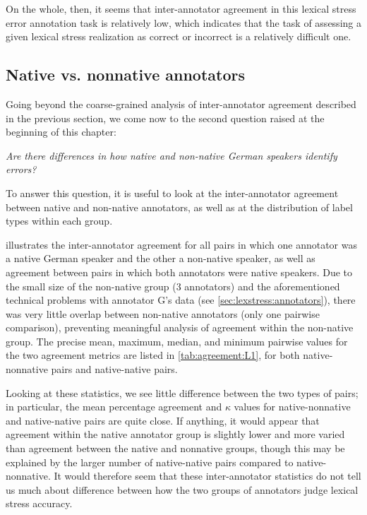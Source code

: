 		
	
		
		 On the whole, then, it seems that inter-annotator agreement in this lexical stress error annotation task is relatively low, which indicates that the task of assessing a given lexical stress realization as correct or incorrect is a relatively difficult one. 
	
	
		\subsection{Native vs. nonnative annotators}
		\label{sec:agreement:native}

		
		
		Going beyond the coarse-grained analysis of inter-annotator agreement described in the previous section, we come now to the second question raised at the beginning of this chapter:
		
		\textit{Are there differences in how native and non-native German speakers identify errors?}
		
		
		To answer this question, it is useful to look at the inter-annotator agreement between native and non-native annotators, as well as at the distribution of label types within each group. 
		
		 illustrates the inter-annotator agreement for all pairs in which one annotator was a native German speaker and the other a non-native speaker, as well as agreement between pairs in which both annotators were native speakers. Due to the small size of the non-native group (3 annotators) and the aforementioned technical problems with annotator G's data (see \cref{sec:lexstress:annotators}), there was very little overlap between non-native annotators (only one pairwise comparison), preventing meaningful analysis of agreement within the non-native group. The precise mean, maximum, median, and minimum pairwise values for the two agreement metrics are listed in \cref{tab:agreement:L1}, for both  native-nonnative pairs and native-native pairs. 
		
		Looking at these statistics, we see little difference between the two types of pairs; in particular, the mean percentage agreement and $\kappa$ values for native-nonnative and native-native pairs are quite close. If anything, it would appear that agreement within the native annotator group is slightly lower and more varied than agreement between the native and nonnative groups, though this may be explained by the larger number of native-native pairs compared to native-nonnative. It would therefore seem that these inter-annotator statistics do not tell us much about difference between how the two groups of annotators judge lexical stress accuracy.
		
